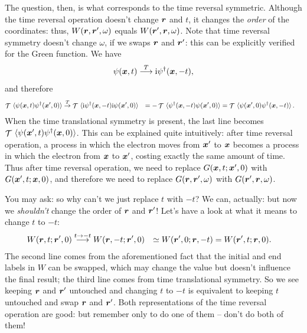 \documentclass[hyperref, a4paper]{report}
\DeclareMathOperator{\timeorder}{\mathcal{T}}
\newcommand*{\ii}{\mathrm{i}}
\def\\{}%
\begin{document}
The question, then, is what corresponds to the time reversal symmetric.
Although the time reversal operation doesn't change $\vb*{r}$ and $t$,
it changes the \emph{order} of the coordinates:
thus, $W(\vb*{r}, \vb*{r}', \omega)$ equals $W(\vb*{r}', \vb*{r}, \omega)$.
Note that time reversal symmetry doesn't change $\omega$, 
if we swaps $\vb*{r}$ and $\vb*{r}'$:
this can be explicitly verified for the Green function.
We have 
\begin{equation}
    \psi(\vb*{x}, t) \stackrel{T}{\longrightarrow} \ii \psi^\dagger (\vb*{x}, -t),
\end{equation}
and therefore 
\begin{equation}
    \begin{aligned}
        \timeorder \expval*{\psi(\vb*{x}, t) \psi^\dagger(\vb*{x}', 0)} 
        &\stackrel{T}{\rightarrow} 
        \timeorder \expval*{\ii \psi^\dagger(\vb*{x}, - t) \ii \psi(\vb*{x}', 0)} \\
        &= - \timeorder \expval*{\psi^\dagger(\vb*{x}, - t) \psi(\vb*{x}', 0)} \\
        &= \timeorder \expval*{\psi(\vb*{x}', 0) \psi^\dagger(\vb*{x}, - t)}.
    \end{aligned}
\end{equation}
When the time translational symmetry is present, 
the last line becomes 
$\timeorder \expval*{\psi(\vb*{x}', t) \psi^\dagger(\vb*{x}, 0)}$.
This can be explained quite intuitively:
after time reversal operation,
a process in which the electron moves from $\vb*{x}'$ to $\vb*{x}$
becomes a process in which the electron from $\vb*{x}$ to $\vb*{x}'$,
costing exactly the same amount of time.
Thus after time reversal operation, 
we need to replace $G(\vb*{x}, t; \vb*{x}', 0)$
with $G(\vb*{x}', t; \vb*{x}, 0)$,
and therefore we need to replace 
$G(\vb*{r}, \vb*{r}', \omega)$ 
with $G(\vb*{r}', \vb*{r}, \omega)$.

You may ask: so why can't we just replace $t$ with $-t$?
We can, actually: but now we \emph{shouldn't} change the order of $\vb*{r}$ and $\vb*{r}'$!
Let's have a look at what it means to change $t$ to $-t$:
\[
    \begin{aligned}
        W(\vb*{r}, t; \vb*{r}', 0) 
        &\stackrel{t \to -t}{\longrightarrow} W(\vb*{r}, -t; \vb*{r}', 0) \\
        &\simeq  W(\vb*{r}', 0; \vb*{r}, -t) \\
        &=       W(\vb*{r}', t; \vb*{r}, 0)  .
    \end{aligned}
\]
The second line comes from the aforementioned fact that 
the initial and end labels in $W$ can be swapped, 
which may change the value 
but doesn't influence the final result;
the third line comes from time translational symmetry.
So we see keeping $\vb*{r}$ and $\vb*{r}'$ untouched 
and changing $t$ to $-t$ 
is equivalent to 
keeping $t$ untouched 
and swap $\vb*{r}$ and $\vb*{r}'$.
Both representations of the time reversal operation are good:
but remember only to do one of them -- don't do both of them!
\end{document}
